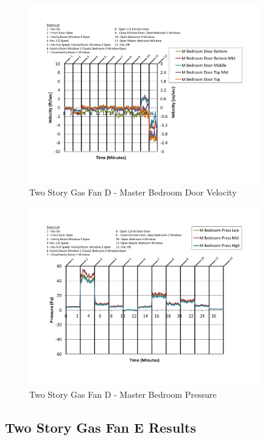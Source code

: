 \documentclass{article}
\begin{document}
\begin{appendices}
	\begin{figure}[H]
		\centering
		\includegraphics[height=3.05in,trim=0.67in 1.1in 0.67in 0.8in,clip=true]{0_Images/Results_Charts/ColdFlow/Two_Story/Gas/D/Master_Bedroom_Door_Velocity.pdf}
		\caption{Two Story Gas Fan D - Master Bedroom Door Velocity}
	\end{figure}
 

	\begin{figure}[H]
		\centering
		\includegraphics[height=3.05in,trim=0.67in 1.1in 0.67in 0.8in,clip=true]{0_Images/Results_Charts/ColdFlow/Two_Story/Gas/D/Master_Bedroom_Pressure.pdf}
		\caption{Two Story Gas Fan D - Master Bedroom Pressure}
	\end{figure}
 
	\clearpage

		\clearpage
\clearpage		\large
\subsection{Two Story Gas Fan E Results} \label{App:Two_StoryGasFanEResults} 


\end{appendices}
\end{document}
